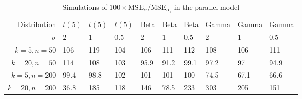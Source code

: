 \begin{table}[ht]
\centering
\caption{Simulations of $100 \times \textrm{MSE}_\alpha/\textrm{MSE}_{\alpha_s}$ in the parallel model} 
\begin{tabular}{rlllllllll}
   Distribution & $t(5)$ & $t(5)$ & $t(5)$ & Beta & Beta & Beta & Gamma & Gamma & Gamma \\
 $\sigma$ & $2$ & $1$ & $0.5$ & $2$ & $1$ & $0.5$ & $2$ & $1$ & $0.5$ \\
$k = 5, n = 50$ & 106 & 119 & 104 & 106 & 111 & 112 & 108 & 106 & 111 \\ 
  $k = 20, n = 50$ & 114 & 108 & 103 & 95.9 & 91.2 & 99.1 & 97.2 & 97 & 94.9 \\ 
  $k = 5, n = 200$ & 99.4 & 98.8 & 102 & 101 & 101 & 100 & 74.5 & 67.1 & 66.6 \\ 
  $k = 20, n = 200$ & 36.8 & 185 & 118 & 146 & 78.5 & 233 & 303 & 205 & 151 \\ 
  \end{tabular}
\end{table}

